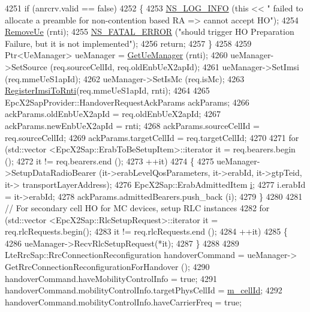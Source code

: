 \begin{DoxyCode}
4251   \textcolor{keywordflow}{if} (anrcrv.valid == \textcolor{keyword}{false})
4252     \{
4253       \hyperlink{group__logging_gafbd73ee2cf9f26b319f49086d8e860fb}{NS\_LOG\_INFO} (\textcolor{keyword}{this} << \textcolor{stringliteral}{" failed to allocate a preamble for non-contention based RA => cannot
       accept HO"});
4254       \hyperlink{classns3_1_1LteEnbRrc_a0e507111feeaf6e7f34555b6141525f7}{RemoveUe} (rnti);
4255       \hyperlink{group__fatal_ga5131d5e3f75d7d4cbfd706ac456fdc85}{NS\_FATAL\_ERROR} (\textcolor{stringliteral}{"should trigger HO Preparation Failure, but it is not implemented"});
4256       \textcolor{keywordflow}{return};
4257     \}
4258 
4259   Ptr<UeManager> ueManager = \hyperlink{classns3_1_1LteEnbRrc_a875653948b565dc50b33f6a0434e32d9}{GetUeManager} (rnti);
4260   ueManager->SetSource (req.sourceCellId, req.oldEnbUeX2apId);
4261   ueManager->SetImsi (req.mmeUeS1apId);
4262   ueManager->SetIsMc (req.isMc);
4263   \hyperlink{classns3_1_1LteEnbRrc_a892009f50761e0c6a8c4a8f8fb0860be}{RegisterImsiToRnti}(req.mmeUeS1apId, rnti);
4264 
4265   EpcX2SapProvider::HandoverRequestAckParams ackParams;
4266   ackParams.oldEnbUeX2apId = req.oldEnbUeX2apId;
4267   ackParams.newEnbUeX2apId = rnti;
4268   ackParams.sourceCellId = req.sourceCellId;
4269   ackParams.targetCellId = req.targetCellId;
4270 
4271   \textcolor{keywordflow}{for} (std::vector <EpcX2Sap::ErabToBeSetupItem>::iterator it = req.bearers.begin ();
4272        it != req.bearers.end ();
4273        ++it)
4274     \{
4275       ueManager->SetupDataRadioBearer (it->erabLevelQosParameters, it->erabId, it->gtpTeid, it->
      transportLayerAddress);
4276       EpcX2Sap::ErabAdmittedItem \hyperlink{bernuolliDistribution_8m_a6f6ccfcf58b31cb6412107d9d5281426}{i};
4277       i.erabId = it->erabId;
4278       ackParams.admittedBearers.push\_back (i);
4279     \}
4280 
4281   \textcolor{comment}{// For secondary cell HO for MC devices, setup RLC instances}
4282   \textcolor{keywordflow}{for} (std::vector <EpcX2Sap::RlcSetupRequest>::iterator it = req.rlcRequests.begin();
4283      it != req.rlcRequests.end ();
4284        ++it)
4285   \{
4286     ueManager->RecvRlcSetupRequest(*it);
4287   \}
4288 
4289   LteRrcSap::RrcConnectionReconfiguration handoverCommand = ueManager->
      GetRrcConnectionReconfigurationForHandover ();
4290   handoverCommand.haveMobilityControlInfo = \textcolor{keyword}{true};
4291   handoverCommand.mobilityControlInfo.targetPhysCellId = \hyperlink{classns3_1_1LteEnbRrc_a4ced331e168e6c1aeca0bb11be19b8c7}{m\_cellId};
4292   handoverCommand.mobilityControlInfo.haveCarrierFreq = \textcolor{keyword}{true};

\end{DoxyCode}
